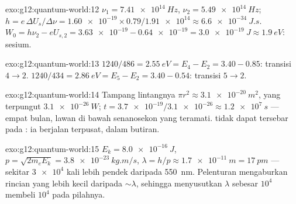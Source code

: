 \begin{solution}{exo:g12:quantum-world:12}
$\nu_1 = \qty{7.41e14}{Hz}$, $\nu_2 = \qty{5.49e14}{Hz}$;
$h = e\,\Delta U_s/\Delta\nu = \num{1.60e-19} \times 0.79 /
\num{1.91e14} \approx \qty{6.6e-34}{J.s}$. $W_0 = h\nu_2 - eU_{s,2} =
\num{3.63e-19} - \num{0.64e-19} = \qty{3.0e-19}{J} \approx
\qty{1.9}{eV}$: sesium.
\end{solution}

\begin{solution}{exo:g12:quantum-world:13}
$1240/486 = \qty{2.55}{eV} = E_4 - E_2 = 3.40 - 0.85$: transisi
$4 \to 2$. $1240/434 = \qty{2.86}{eV} = E_5 - E_2 = 3.40 - 0.54$:
transisi $5 \to 2$.
\end{solution}

\begin{solution}{exo:g12:quantum-world:14}
Tampang lintangnya $\pi r^2 \approx \qty{3.1e-20}{m^2}$,  yang terpungut
$\qty{3.1e-26}{W}$; $t = \num{3.7e-19}/\num{3.1e-26} \approx
\qty{1.2e7}{s}$ --- empat bulan, lawan di bawah senanosekon yang teramati.
 tidak dapat tersebar pada : ia berjalan
terpusat, dalam butiran.
\end{solution}

\begin{solution}{exo:g12:quantum-world:15}
$E_k = \qty{8.0e-16}{J}$, $p = \sqrt{2m_e E_k} =
\qty{3.8e-23}{kg.m/s}$, $\lambda = h/p \approx \qty{1.7e-11}{m} =
\qty{17}{pm}$ --- sekitar $\num{3e4}$ kali lebih pendek daripada \qty{550}{nm}.
Pelenturan mengaburkan rincian yang lebih kecil daripada $\sim\lambda$, sehingga menyusutkan
$\lambda$ sebesar $10^4$ membeli $10^4$ pada  pilahnya.
\end{solution}

